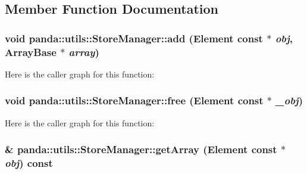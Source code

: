 \subsection{Member Function Documentation}
\hypertarget{classpanda_1_1utils_1_1StoreManager_a00231bb2c891092ad0f9d5a1a0bd6ca7}{
\subsubsection[{add}]{\setlength{\rightskip}{0pt plus 5cm}void panda::utils::StoreManager::add ({\bf Element} const $\ast$ {\em obj}, \/  {\bf ArrayBase} $\ast$ {\em array})}}
\label{classpanda_1_1utils_1_1StoreManager_a00231bb2c891092ad0f9d5a1a0bd6ca7}


Here is the caller graph for this function:\hypertarget{classpanda_1_1utils_1_1StoreManager_aa15753a379877e64b2d967886aca2021}{
\subsubsection[{free}]{\setlength{\rightskip}{0pt plus 5cm}void panda::utils::StoreManager::free ({\bf Element} const $\ast$ {\em \_\-obj})}}
\label{classpanda_1_1utils_1_1StoreManager_aa15753a379877e64b2d967886aca2021}


Here is the caller graph for this function:\hypertarget{classpanda_1_1utils_1_1StoreManager_abe68d6fb7a29bcb532f6cf32821df95b}{
\subsubsection[{getArray}]{\& panda::utils::StoreManager::getArray ({\bf Element} const $\ast$ {\em obj}) const}}
\label{classpanda_1_1utils_1_1StoreManager_abe68d6fb7a29bcb532f6cf32821df95b}



